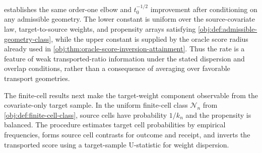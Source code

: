  establishes the same order-one elbow and \(t_0^{-1/2}\) improvement after conditioning on any admissible geometry. The lower constant is uniform over the source-covariate law, target-to-source weights, and propensity arrays satisfying \cref{obj:def:admissible-geometry-class}, while the upper constant is supplied by the oracle score radius already used in \cref{obj:thm:oracle-score-inversion-attainment}. Thus the rate is a feature of weak transported-ratio information under the stated dispersion and overlap conditions, rather than a consequence of averaging over favorable transport geometries.

The finite-cell results next make the target-weight component observable from the covariate-only target sample. In the uniform finite-cell class \(\mathcal N_n\) from \cref{obj:def:finite-cell-class}, source cells have probability \(1/k_n\) and the propensity is balanced. The procedure estimates target cell probabilities by empirical frequencies, forms source cell contrasts for outcome and receipt, and inverts the transported score using a target-sample U-statistic for weight dispersion.

